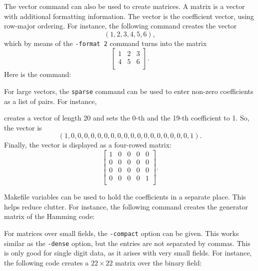 The vector command can also be used to create matrices. 
A matrix is a vector with additional formatting information.
The vector is the coefficient vector, 
using row-major ordering.
For instance, the following command creates the vector 
$$
(1,2,3,4,5,6),
$$
which by means of the \verb'-format 2' command turns into the matrix 
$$
\left[
\begin{array}{ccc}
	1 & 2 & 3 \\
	4 & 5 & 6 \\
\end{array}
\right].
$$
Here is the command:



\bigskip

For large vectors, the \verb'sparse' 
command can be used to enter non-zero coefficients as a list of pairs. 
For instance,


creates a vector of length 20 and 
sets the 0-th and the 19-th coefficient to 1. 
So, the vector is 
$$
(1,0,0,0,0,0,0,0,0,0,0,0,0,0,0,0,0,0,0,1).
$$
Finally, the vector is displayed as a four-rowed matrix:
$$
\left[
\begin{array}{ccccc}
	1 & 0 & 0 & 0 & 0 \\
	0 & 0 & 0 & 0 & 0 \\
	0 & 0 & 0 & 0 & 0 \\
	0 & 0 & 0 & 0 & 1 \\
\end{array}
\right].
$$

\bigskip


Makefile variables can be used to hold 
the coefficients in a separate place. 
This helps reduce clutter.
For instance, the following command creates 
the generator matrix of the Hamming code:





\bigskip


For matrices over small fields, 
the \verb'-compact' option can be given.
This works similar as the \verb'-dense' option, 
but the entries are not separated by commas. 
This is only good for single digit data, 
as it arises with very small fields. 
For instance, the following code creates 
a $22 \times 22$ matrix over the binary field:






